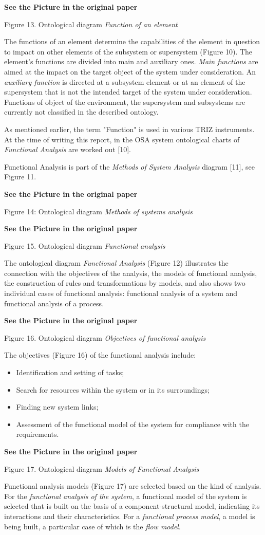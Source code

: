 \documentclass[11pt,a4paper]{article}
\newcommand{\addpicture}{\textbf{See the Picture in the original paper}\par}
\begin{document}
\begin{center}
  \addpicture
  Figure 13. Ontological diagram \emph{Function of an element}
\end{center}
The functions of an element determine the capabilities of the element in
question to impact on other elements of the subsystem or supersystem (Figure
10).  The element's functions are divided into main and auxiliary ones.
\emph{Main functions} are aimed at the impact on the target object of the
system under consideration.  An \emph{auxiliary function} is directed at a
subsystem element or at an element of the supersystem that is not the intended
target of the system under consideration. Functions of object of the
environment, the supersystem and subsystems are currently not classified in
the described ontology.

As mentioned earlier, the term "Function" is used in various TRIZ instruments.
At the time of writing this report, in the OSA system ontological charts of
\emph{Functional Analysis} are worked out [10].

Functional Analysis is part of the \emph{Methods of System Analysis} diagram
[11], see Figure 11.
\begin{center}
  \addpicture
  Figure 14: Ontological diagram \emph{Methods of systems analysis}
\end{center}
\begin{center}
  \addpicture
  Figure 15. Ontological diagram \emph{Functional analysis}
\end{center}
The ontological diagram \emph{Functional Analysis} (Figure 12) illustrates the
connection with the objectives of the analysis, the models of functional
analysis, the construction of rules and transformations by models, and also
shows two individual cases of functional analysis: functional analysis of a
system and functional analysis of a process.
\begin{center}
  \addpicture
  Figure 16. Ontological diagram \emph{Objectives of functional analysis}
\end{center}
The objectives (Figure 16) of the functional analysis include:
\begin{itemize}[noitemsep]
\item Identification and setting of tasks;
\item Search for resources within the system or in its surroundings;
\item Finding new system links;
\item Assessment of the functional model of the system for compliance with the
  requirements.
\end{itemize}
\begin{center}
  \addpicture
  Figure 17. Ontological diagram \emph{Models of Functional Analysis}
\end{center}
Functional analysis models (Figure 17) are selected based on the kind of
analysis. For the \emph{functional analysis of the system}, a functional model
of the system is selected that is built on the basis of a component-structural
model, indicating its interactions and their characteristics. For a
\emph{functional process model}, a model is being built, a particular case of
which is the \emph{flow model}.
\end{document}
